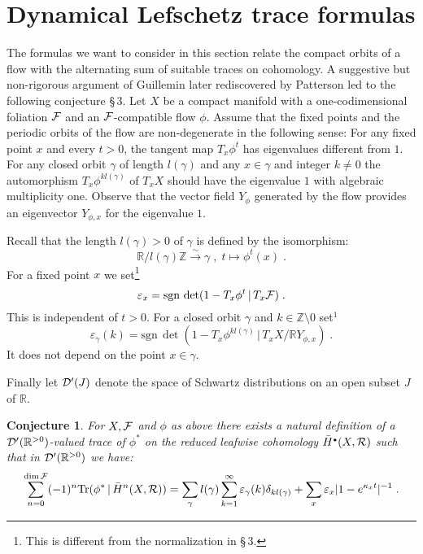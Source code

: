 \documentclass[11pt,leqno]{article}
\newcommand{\R}{{\mathbb{R}}}
\newcommand{\Z}{{\mathbb{Z}}}
\newcommand{\sgn}{\mathrm{sgn}\,}
\newcommand{\Tr}{\mathrm{Tr}}
\newcommand{\Dh}{{\cal D}}
\newcommand{\Fh}{{\cal F}}
\newcommand{\Rh}{{\cal R}}
\newcommand{\oH}{\bar{H}}
\newcommand{\ohne}{\setminus}
\newcommand{\silo}{\stackrel{\sim}{\longrightarrow}}
\newcommand{\tei}{\, | \,}
\newcommand{\hullet}{{\scriptscriptstyle \bullet}}
\newtheorem{conj}[theorem]{Conjecture}
\begin{document}
\section{Dynamical Lefschetz trace formulas}
The formulas we want to consider in this section relate the compact orbits of a flow with the alternating sum of suitable traces on cohomology. A suggestive but non-rigorous argument of Guillemin \cite{G} later rediscovered by Patterson \cite{P} led to the following conjecture \cite{D10} \S\,3. Let $X$ be a compact manifold with a one-codimensional foliation $\Fh$ and an $\Fh$-compatible flow $\phi$. Assume that the fixed points and the periodic orbits of the flow are non-degenerate in the following sense: For any fixed point $x$ and every $t > 0$, the tangent map $T_x \phi^t$ has eigenvalues different from $1$. For any closed orbit $\gamma$ of length $l (\gamma)$ and any $x \in \gamma$ and integer $k \neq 0$ the automorphism $T_x \phi^{kl (\gamma)}$ of $T_x X$ should have the eigenvalue $1$ with algebraic multiplicity one. Observe that the vector field $Y_{\phi}$ generated by the flow provides an eigenvector $Y_{\phi,x}$ for the eigenvalue $1$. 

Recall that the length $l (\gamma) > 0$ of $\gamma$ is defined by the isomorphism:
\[
\R / l (\gamma) \Z \silo \gamma \; , \; t \longmapsto \phi^t (x) \; .
\]
For a fixed point $x$ we set\footnote{This is different from the normalization in \cite{D10} \S\,3.}
\[
\varepsilon_x = \sgn \det (1 - T_x \phi^t \tei T_x \Fh) \; .
\]
This is independent of $t > 0$. For a closed orbit $\gamma$ and $k \in \Z \ohne 0$ set$^1$
\[
\varepsilon_{\gamma} (k) = \sgn \det (1 - T_x \phi^{kl (\gamma)} \tei T_x X / \R Y_{\phi,x}) \; .
\]
It does not depend on the point $x \in \gamma$.

Finally let $\Dh' (J)$ denote the space of Schwartz distributions on an open subset $J$ of $\R$. 

\begin{conj}
  \label{t5}
For $X , \Fh$ and $\phi$ as above there exists a natural definition of a $\Dh' (\R^{>0})$-valued trace of $\phi^*$ on the reduced leafwise cohomology $\oH^{\hullet} (X,\Rh)$ such that in $\Dh' (\R^{>0})$ we have:
\begin{equation}
  \label{eq:20}
\sum\limits^{\dim \Fh}_{n=0} (-1)^n \Tr (\phi^* \tei \oH^n (X,\Rh)) = \sum\limits_{\gamma} l (\gamma) \sum\limits^{\infty}_{k=1} \varepsilon_{\gamma} (k) \delta_{kl (\gamma)} + \sum\limits_x \varepsilon_x |1 - e^{\kappa_x t}|^{-1} \; .
\end{equation}
\end{conj}
\end{document}
